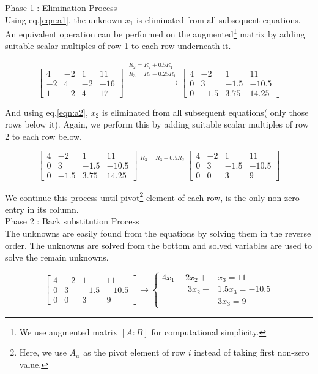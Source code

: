 	Phase 1 : Elimination Process\\

	Using eq.\ref{eqn:a1}, the unknown $x_1$ is eliminated from all subsequent equations. An equivalent operation can be performed on the augmented\footnote{We use augmented matrix $[A:B]$ for computational simplicity.} matrix by adding suitable scalar multiples of row 1 to each row underneath it.

	\[ \begin{bmatrix} 4 & -2 & 1 & 11 \\ -2 & 4 & -2 & -16 \\ 1 & -2 & 4 & 17 \end{bmatrix} \xrightarrow{\substack{R_2 = R_2 + 0.5R_1\\ R_3 = R_3 - 0.25R_1}} \begin{bmatrix} 4 & -2 & 1 & 11 \\ 0 & 3 & -1.5 & -10.5 \\ 0 & -1.5 & 3.75 & 14.25 \end{bmatrix}\]

	And using eq.\ref{eqn:a2}, $x_2$ is eliminated from all subsequent equations( only those rows below it). Again, we perform this by adding suitable scalar multiples of row 2 to each row below.

	\[ \begin{bmatrix} 4 & -2 & 1 & 11 \\ 0 & 3 & -1.5 & -10.5 \\ 0 & -1.5 & 3.75 & 14.25 \end{bmatrix} \xrightarrow{R_3 = R_3 + 0.5R_2} \begin{bmatrix} 4 & -2 & 1 & 11 \\ 0 & 3 & -1.5 & -10.5 \\ 0 & 0 & 3 & 9 \end{bmatrix} \]

	We continue this process until pivot\footnote{Here, we use $A_{ii}$ as the pivot element of row $i$ instead of taking first non-zero value.} element of each row, is the only non-zero entry in its column.\\

	Phase 2 : Back substitution Process\\

	The unknowns are easily found from the equations by solving them in the reverse order. The unknowns are solved from the bottom and solved variables are used to solve the remain unknowns.

	\[ \begin{bmatrix} 4 & -2 & 1 & 11 \\ 0 & 3 & -1.5 & -10.5 \\ 0 & 0 & 3 & 9 \end{bmatrix} \to \begin{cases} 4x_1 - 2x_2 + &x_3  = 11 \\ \quad \qquad 3x_2 - &1.5x_3  = -10.5 \\  &3x_3 = 9 \end{cases}  \]

